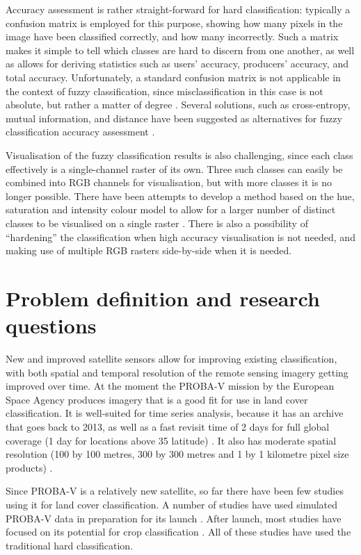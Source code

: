 \documentclass[a4paper,10pt]{article}
\begin{document}
Accuracy assessment is rather straight-forward for hard classification: typically a confusion matrix is employed for this purpose, showing how many pixels in the image have been classified correctly, and how many incorrectly. Such a matrix makes it simple to tell which classes are hard to discern from one another, as well as allows for deriving statistics such as users' accuracy, producers' accuracy, and total accuracy. Unfortunately, a standard confusion matrix is not applicable in the context of fuzzy classification, since misclassification in this case is not absolute, but rather a matter of degree \cite{foody2002accuracy}. Several solutions, such as cross-entropy, mutual information, and distance have been suggested as alternatives for fuzzy classification accuracy assessment \cite{lu2007methods}.

Visualisation of the fuzzy classification results is also challenging, since each class effectively is a single-channel raster of its own. Three such classes can easily be combined into RGB channels for visualisation, but with more classes it is no longer possible. There have been attempts to develop a method based on the hue, saturation and intensity colour model to allow for a larger number of distinct classes to be visualised on a single raster \cite{hengl2004fuzzycmeans}. There is also a possibility of ``hardening'' the classification when high accuracy visualisation is not needed, and making use of multiple RGB rasters side-by-side when it is needed.

\section{Problem definition and research questions}

New and improved satellite sensors allow for improving existing classification, with both spatial and temporal resolution of the remote sensing imagery getting improved over time. At the moment the PROBA-V mission by the European Space Agency produces imagery that is a good fit for use in land cover classification. It is well-suited for time series analysis, because it has an archive that goes back to 2013, as well as a fast revisit time of 2 days for full global coverage (1 day for locations above 35\textdegree{} latitude) \cite{dierckx2014probav}. It also has moderate spatial resolution (100 by 100 metres, 300 by 300 metres and 1 by 1 kilometre pixel size products) \cite{probavguide}.

Since PROBA-V is a relatively new satellite, so far there have been few studies using it for land cover classification. A number of studies have used simulated PROBA-V data in preparation for its launch \cite{stathakis2014probavurban} \cite{roumenina2013probavcrops} \cite{bartalev2014probavboreal}. After launch, most studies have focused on its potential for crop classification \cite{roumenina2015probavcrops} \cite{durgun2016crop} \cite{lambert2016cropland}. All of these studies have used the traditional hard classification.
\end{document}
